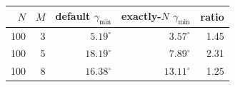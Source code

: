 \footnotesize
\setlength{\tabcolsep}{8pt}
\begin{tabular}{rrrrr}
\toprule
$N$ & $M$ & default $\gamma_{\min}$ & exactly-$N$ $\gamma_{\min}$ & ratio \\
\midrule
100 & 3 & $5.19^\circ$ & $3.57^\circ$ & 1.45 \\
100 & 5 & $18.19^\circ$ & $7.89^\circ$ & 2.31 \\
100 & 8 & $16.38^\circ$ & $13.11^\circ$ & 1.25 \\
\bottomrule
\end{tabular}
